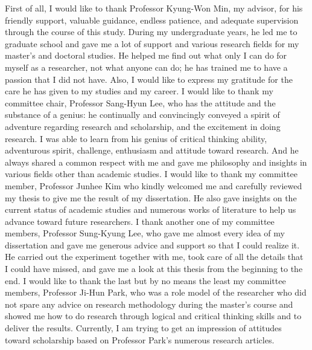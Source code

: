 First of all, I would like to thank Professor Kyung-Won Min, my advisor, for his friendly support, valuable guidance, endless patience, and adequate supervision through the course of this study. During my undergraduate years, he led me to graduate school and gave me a lot of support and various research fields for my master's and doctoral studies. He helped me find out what only I can do for myself as a researcher, not what anyone can do; he has trained me to have a passion that I did not have. Also, I would like to express my gratitude for the care he has given to my studies and my career. I would like to thank my committee chair, Professor Sang-Hyun Lee, who has the attitude and the substance of a genius: he continually and convincingly conveyed a spirit of adventure regarding research and scholarship, and the excitement in doing research. I was able to learn from his genius of critical thinking ability, adventurous spirit, challenge, enthusiasm and attitude toward research. And he always shared a common respect with me and gave me philosophy and insights in various fields other than academic studies. I would like to thank my committee member, Professor Junhee Kim who kindly welcomed me and carefully reviewed my thesis to give me the result of my dissertation. He also gave insights on the current status of academic studies and numerous works of literature to help us advance toward future researchers. I thank another one of my committee members, Professor Sung-Kyung Lee, who gave me almost every idea of my dissertation and gave me generous advice and support so that I could realize it. He carried out the experiment together with me, took care of all the details that I could have missed, and gave me a look at this thesis from the beginning to the end. I would like to thank the last but by no means the least my committee members, Professor Ji-Hun Park, who was a role model of the researcher who did not spare any advice on research methodology during the master's course and showed me how to do research through logical and critical thinking skills and to deliver the results. Currently, I am trying to get an impression of attitudes toward scholarship based on Professor Park's numerous research articles. 

